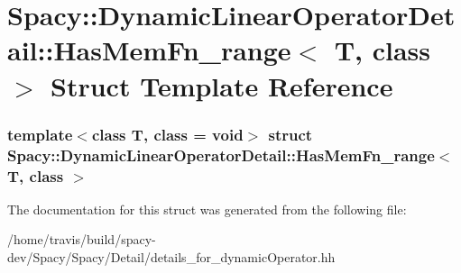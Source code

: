 \hypertarget{structSpacy_1_1DynamicLinearOperatorDetail_1_1HasMemFn__range}{\section{\-Spacy\-:\-:\-Dynamic\-Linear\-Operator\-Detail\-:\-:\-Has\-Mem\-Fn\-\_\-range$<$ \-T, class $>$ \-Struct \-Template \-Reference}
\label{structSpacy_1_1DynamicLinearOperatorDetail_1_1HasMemFn__range}
}
\subsubsection*{template$<$class T, class = void$>$ struct Spacy\-::\-Dynamic\-Linear\-Operator\-Detail\-::\-Has\-Mem\-Fn\-\_\-range$<$ T, class $>$}



\-The documentation for this struct was generated from the following file\-:\begin{DoxyCompactItemize}
\item 
/home/travis/build/spacy-\/dev/\-Spacy/\-Spacy/\-Detail/details\-\_\-for\-\_\-dynamic\-Operator.\-hh\end{DoxyCompactItemize}
